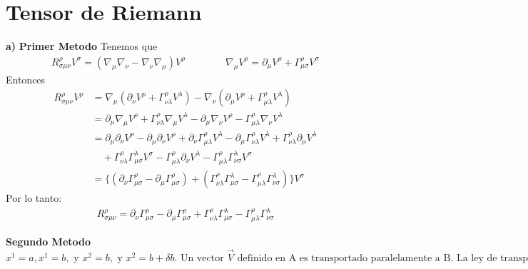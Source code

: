 \documentclass{article}
\begin{document}
\section{Tensor de Riemann}
\textbf{a) } \textbf{Primer Metodo} Tenemos que 
\begin{gather*}
  R^\rho_{\sigma\mu\nu} V^\sigma = (\nabla_\mu \nabla_\nu - \nabla_\nu \nabla_\mu) V^\rho \qquad \qquad  \nabla_\mu V^\rho = \partial_\mu V^\rho + \Gamma^\rho_{\mu\sigma} V^\sigma
\end{gather*}
Entonces 
\begin{align*}
  R _{\sigma\mu\nu} ^ {\rho} V ^ {\rho} &= \nabla _{\mu} (\partial_\nu V ^ {\rho} + \Gamma _{\nu\lambda} ^ {\rho} V ^ {\lambda}) - \nabla_\nu(\partial_\mu V ^ {\rho} + \Gamma _{\mu\lambda} ^ {\rho } V ^ {\lambda}) \\
  &= \partial_\mu \nabla_\mu V^\rho + \Gamma _{\nu\lambda} ^ {\rho} \nabla_\mu V^\lambda - \partial_\mu \nabla_\nu V^\rho - \Gamma _{\mu\lambda} ^ {\rho} \nabla_\nu V^\lambda\\
  &= \partial_\mu \partial_\nu V^\rho - \partial_\mu \partial_\nu V^\rho + \partial_\nu \Gamma _{\mu\lambda} ^\rho V^\lambda - \partial_\mu\Gamma _{\nu\lambda} ^\rho V^\lambda + \Gamma _{\nu\lambda} ^\rho \partial_\mu V^\lambda \\
  &\quad + \Gamma _{\nu\lambda} ^\rho \Gamma_{\mu\sigma}^\lambda V^\sigma - \Gamma _{\mu\lambda} ^\rho \partial_\nu V^\lambda - \Gamma _{\mu\lambda } ^\rho \Gamma _{\nu\sigma} ^\lambda V^\sigma \\
  &=\{(\partial_\nu \Gamma _{\mu\sigma} ^\rho - \partial_\mu \Gamma _{\mu\sigma}^\rho) + (\Gamma _{\nu\lambda}^\rho \Gamma _{\mu\sigma}^\lambda - \Gamma _{\mu\lambda}^\rho \Gamma _{\nu\sigma}^\lambda)\}V ^ {\sigma}
\end{align*}
Por lo tanto: 
\begin{gather*}
   R _{\sigma\mu\nu} ^ {\rho} = \partial_\nu \Gamma _{\mu\sigma} ^\rho - \partial_\mu \Gamma _{\mu\sigma}^\rho + \Gamma _{\nu\lambda}^\rho \Gamma _{\mu\sigma}^\lambda - \Gamma _{\mu\lambda}^\rho \Gamma _{\nu\sigma}^\lambda
\end{gather*}

\hfill

\hfill

\textbf{Segundo Metodo } \( x^1 = a, x^1 = b, \text{ y } x^2 = b, \text{ y } x^2 = b + \delta b. \text{ Un vector } \Vec{V} \text{ definido en A es transportado paralelamente a B. La ley de transporte paralelo } \nabla_{V_2} \Vec{V} = 0 \text{ tiene la forma componente} \)
\end{document}
